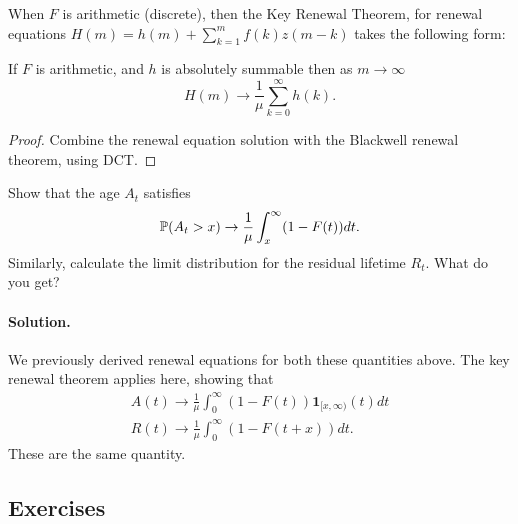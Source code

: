 \documentclass[12pt]{article}
\begin{document}
When $F$ is arithmetic (discrete), then the Key Renewal Theorem, for renewal equations $H(m) = h(m) + \sum_{k=1}^m f(k) z(m-k)$ takes the following form:
\begin{theorem}
    If $F$ is arithmetic, and $h$ is absolutely summable then as $m \rightarrow \infty$
    \[
    H(m) \rightarrow \frac{1}{\mu} \sum_{k=0}^\infty h(k).
    \]
\end{theorem}
\begin{proof}
Combine the renewal equation solution with the Blackwell renewal theorem, using DCT.
\end{proof}

\begin{exercise}
Show that the age $A_t$ satisfies
\[
\mathbb{P}(A_t > x) \rightarrow \frac{1}{\mu}\int_x^\infty (1 - F(t))dt.
\]
Similarly, calculate the limit distribution for the residual lifetime $R_t.$ What do you get?

\paragraph{Solution.} We previously derived renewal equations for both these quantities above. The key renewal theorem applies here, showing that 
\begin{gather}
    A(t) \rightarrow \frac{1}{\mu}\int_0^\infty (1-F(t))\mathbf{1}_{[x,\infty)}(t) dt  \\ 
    R(t)\rightarrow \frac{1}{\mu}\int_0^\infty (1-F(t+x)) dt.
\end{gather}
These are the same quantity.
\end{exercise}

\subsection{Exercises}
\end{document}

